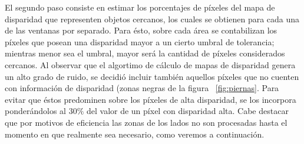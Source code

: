 \documentclass[journal]{IEEEtran}
\begin{document}
El segundo paso consiste en estimar los porcentajes de p\'ixeles del mapa de disparidad que representen objetos cercanos, los cuales se obtienen para cada una de las ventanas por separado. Para \'esto, sobre cada \'area se contabilizan los p\'ixeles que posean una disparidad mayor a un cierto umbral de tolerancia; mientras menor sea el umbral, mayor ser\'a la cantidad de p\'ixeles considerados cercanos. Al observar que el algortimo de c\'alculo de mapas de disparidad genera un alto grado de ruido, se decidi\'o incluir tambi\'en aquellos p\'ixeles que no cuenten con informaci\'on de disparidad (zonas negras de la figura ~\ref{fig:piernas}. Para evitar que \'estos predominen sobre los p\'ixeles de alta disparidad, se los incorpora ponder\'andolos al $30\%$ del valor de un p\'ixel con disparidad alta. Cabe destacar que por motivos de eficiencia las zonas de los lados no son procesadas hasta el momento en que realmente sea necesario, como veremos a continuaci\'on.
\end{document}
